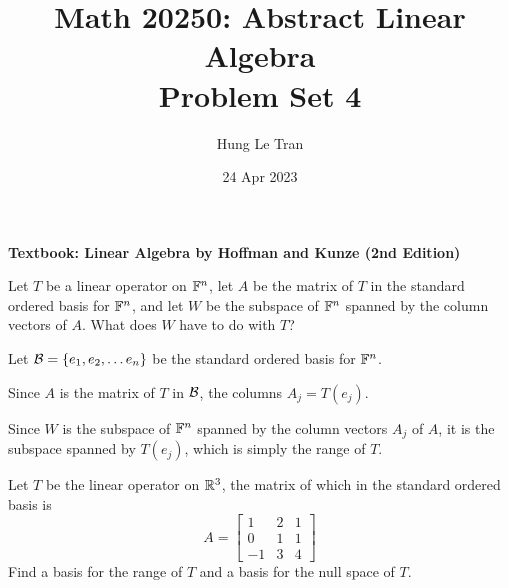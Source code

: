 \documentclass[a4paper, 11pt]{article}
\title{Math 20250: Abstract Linear Algebra \\ \large Problem Set 4}
\date{24 Apr 2023}
\author{Hung Le Tran}
\begin{document}
\maketitle
\newpage
\setcounter{section}{4}
\textbf{Textbook: Linear Algebra by Hoffman and Kunze (2nd Edition)}
\begin{problem} 
Let \(T\) be a linear operator on \(\mathbb{F}^n\), let \(A\) be the matrix of \(T\) in the standard ordered basis for \(\mathbb{F}^n\), and let \(W\) be the subspace of \(\mathbb{F}^n\) spanned by the column vectors of \(A\). What does \(W\) have to do with \(T\)?
\end{problem}
\begin{solution}
    Let \(\mathcal{B}= \{e_1, e_2, \dots e_n\}\) be the standard ordered basis for \(\mathbb{F}^n\).

    Since \(A\) is the matrix of \(T\) in \(\mathcal{B}\), the columns \(A_j = T(e_j)\).

    Since \(W\) is the subspace of \(\mathbb{F}^n\) spanned by the column vectors \(A_j\) of \(A\), it is the subspace spanned by \(T(e_j)\), which is simply the range of \(T\).
\end{solution}
\begin{problem} 
Let \(T\) be the linear operator on \(\mathbb{R}^3\), the matrix of which in the standard ordered basis is \[
    A = \left[\begin{array}{ccc}
            1  & 2 & 1 \\
            0  & 1 & 1 \\
            -1 & 3 & 4
        \end{array}\right]
\]
Find a basis for the range of \(T\) and a basis for the null space of \(T\).
\end{problem}
\end{document}

